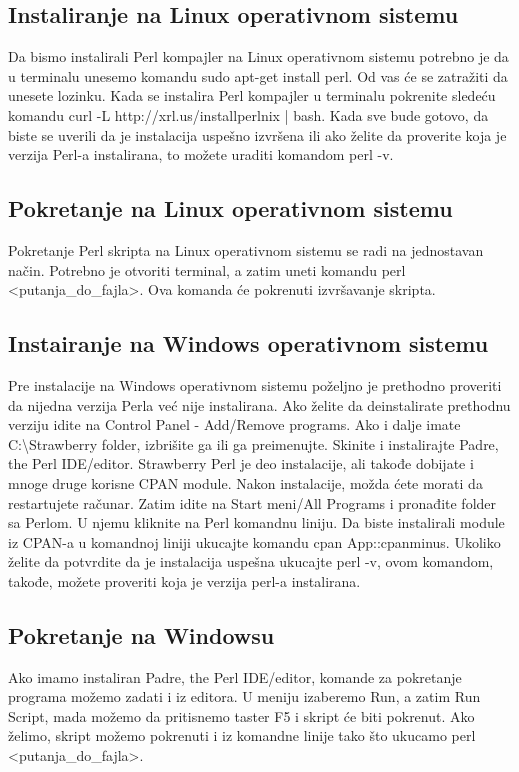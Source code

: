 \documentclass[a4paper]{article}
\begin{document}
\subsection{Instaliranje na Linux operativnom sistemu}
Da bismo instalirali Perl kompajler na Linux operativnom sistemu potrebno je da u terminalu unesemo komandu sudo apt-get install perl. Od vas će se zatražiti da unesete lozinku. Kada se instalira Perl kompajler u terminalu pokrenite sledeću komandu curl -L http://xrl.us/installperlnix | bash. Kada sve bude gotovo, da biste se uverili da je instalacija uspešno izvršena ili ako želite da proverite koja je verzija Perl-a instalirana, to možete uraditi komandom perl -v.

\subsection{Pokretanje na Linux operativnom sistemu}
Pokretanje Perl skripta na Linux operativnom sistemu se radi na jednostavan način. Potrebno je otvoriti terminal, a zatim uneti komandu perl <putanja\_do\_fajla>. Ova komanda će pokrenuti izvršavanje skripta.

\subsection{Instairanje na Windows operativnom sistemu}
Pre instalacije na Windows operativnom sistemu poželjno je  prethodno proveriti da nijedna verzija Perla već nije instalirana. Ako želite da deinstalirate prethodnu verziju idite na Control Panel - Add/Remove programs. Ako i dalje imate C:\textbackslash Strawberry folder, izbrišite ga ili ga preimenujte. Skinite i instalirajte Padre, the Perl IDE/editor. Strawberry Perl je deo instalacije, ali takođe dobijate i mnoge druge korisne CPAN module. Nakon instalacije, možda ćete morati da restartujete računar. Zatim idite na Start meni/All Programs i pronađite folder sa Perlom. U njemu kliknite na Perl komandnu liniju.  Da biste instalirali module iz CPAN-a u komandnoj liniji ukucajte komandu cpan App::cpanminus. Ukoliko želite da  potvrdite da je instalacija uspešna ukucajte perl -v, ovom komandom, takođe, možete proveriti koja je verzija perl-a instalirana.

\subsection{Pokretanje na Windowsu}
Ako imamo instaliran Padre, the Perl IDE/editor, komande za pokretanje programa možemo zadati i iz editora. U meniju izaberemo Run, a zatim Run Script, mada možemo da pritisnemo taster F5 i skript \'ce biti pokrenut.
Ako želimo, skript možemo pokrenuti i iz komandne linije tako što ukucamo perl <putanja\_do\_fajla>.
\end{document}
